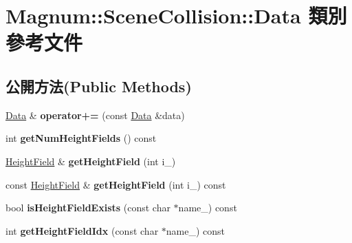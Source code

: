 \hypertarget{class_magnum_1_1_scene_collision_1_1_data}{}\section{Magnum\+:\+:Scene\+Collision\+:\+:Data 類別 參考文件}
\label{class_magnum_1_1_scene_collision_1_1_data}
\subsection*{公開方法(Public Methods)}
\begin{DoxyCompactItemize}
\item 
\hyperlink{class_magnum_1_1_scene_collision_1_1_data}{Data} \& {\bfseries operator+=} (const \hyperlink{class_magnum_1_1_scene_collision_1_1_data}{Data} \&data)\hypertarget{class_magnum_1_1_scene_collision_1_1_data_adad0bf3aba3ce5245b6dc0e106baecd4}{}\label{class_magnum_1_1_scene_collision_1_1_data_adad0bf3aba3ce5245b6dc0e106baecd4}

\item 
int {\bfseries get\+Num\+Height\+Fields} () const \hypertarget{class_magnum_1_1_scene_collision_1_1_data_ac7e5cb6b77b169f5b0f247bfa217bf4a}{}\label{class_magnum_1_1_scene_collision_1_1_data_ac7e5cb6b77b169f5b0f247bfa217bf4a}

\item 
\hyperlink{class_magnum_1_1_scene_collision_1_1_height_field}{Height\+Field} \& {\bfseries get\+Height\+Field} (int i\+\_\+)\hypertarget{class_magnum_1_1_scene_collision_1_1_data_aff317f2ebd7969e8a693407087249514}{}\label{class_magnum_1_1_scene_collision_1_1_data_aff317f2ebd7969e8a693407087249514}

\item 
const \hyperlink{class_magnum_1_1_scene_collision_1_1_height_field}{Height\+Field} \& {\bfseries get\+Height\+Field} (int i\+\_\+) const \hypertarget{class_magnum_1_1_scene_collision_1_1_data_a72e2b98ceebe256dfd990ca100d67934}{}\label{class_magnum_1_1_scene_collision_1_1_data_a72e2b98ceebe256dfd990ca100d67934}

\item 
bool {\bfseries is\+Height\+Field\+Exists} (const char $\ast$name\+\_\+) const \hypertarget{class_magnum_1_1_scene_collision_1_1_data_a1440fcd728546a21f94a27bc94bebb5a}{}\label{class_magnum_1_1_scene_collision_1_1_data_a1440fcd728546a21f94a27bc94bebb5a}

\item 
int {\bfseries get\+Height\+Field\+Idx} (const char $\ast$name\+\_\+) const \hypertarget{class_magnum_1_1_scene_collision_1_1_data_ab3f1326321752e630e192534f21399df}{}\label{class_magnum_1_1_scene_collision_1_1_data_ab3f1326321752e630e192534f21399df}


\end{DoxyCompactItemize}
